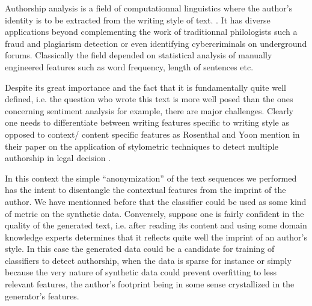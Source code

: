 Authorship analysis is a field of computationnal linguistics where
the author's identity is to be extracted from the writing style of text.
\cite{stylo}. It has diverse applications beyond complementing the
work of traditionnal philologists such a fraud and plagiarism detection
or even identifying cybercriminals on underground forums\cite{doppel}.
Classically the field depended on statistical analysis 
of manually engineered features such as word frequency, length of 
sentences etc. 

Despite its great importance and the fact that it is fundamentally
quite well defined, i.e. the question who wrote this text
is more well posed than the ones concerning sentiment analysis for
example, there are major challenges. Clearly one needs to differentiate
between writing features specific to writing style as opposed to
context/ content specific features as Rosenthal and Yoon mention in 
their paper on the application of stylometric techniques to detect
multiple authorship in legal decision .

In this context the simple ``anonymization'' of the text sequences we performed
has the intent to disentangle the contextual features from the imprint of the
author. We have mentionned before that the classifier could be used as some
kind of metric on the synthetic data. Conversely, suppose one is fairly
confident in the quality of the generated text, i.e. after reading its content
and using some domain knowledge experts determines that it reflects quite well
the imprint of an author's style. In this case the generated data could be a
candidate for training of classifiers to detect authorship, when the data is
sparse for instance or simply because the very nature of synthetic data could
prevent overfitting to less relevant features, the author's footprint being 
in some sense crystallized in the generator's features.


\clearpage
